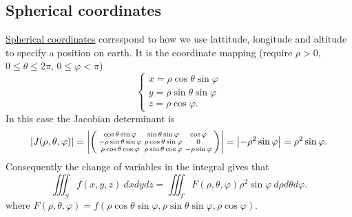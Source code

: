 \subsection*{Spherical coordinates}

\href{https://en.wikipedia.org/wiki/Spherical_coordinate_system}{Spherical coordinates} correspond to how we use lattitude, longitude and altitude to specify a position on earth.
It is the coordinate mapping (require \(\rho>0\), \(0\leq \theta \leq 2\pi\), \(0\leq \varphi <\pi\))
\[
    \begin{cases}
        x = \rho \cos \theta \sin \varphi \\
        y = \rho \sin \theta \sin \varphi \\
        z = \rho \cos \varphi.
    \end{cases}
\]
In this case the Jacobian determinant is
\[
    \left|J(\rho,\theta,\varphi)\right|
    =
    \left|\left(\begin{smallmatrix}
            \cos \theta \sin \varphi       & \sin \theta \sin \varphi      & \cos \varphi        \\
            -\rho \sin \theta \sin \varphi & \rho \cos \theta \sin \varphi & 0                   \\
            \rho \cos \theta \cos \varphi  & \rho \sin \theta \cos \varphi & - \rho \sin \varphi
        \end{smallmatrix}\right)\right|
    =
    \left|- \rho^2 \sin \varphi\right|
    = \rho^2 \sin \varphi.
\]
Consequently the change of variables in the integral gives that
\[
    \iiint_{S} f(x,y,z) \ dx dy dz =  \iiint_{T}  F(\rho,\theta,\varphi) \rho^2 \sin \varphi  \ d\rho d\theta d\varphi.
\]
where \(F(\rho,\theta,\varphi) = f(\rho \cos \theta \sin \varphi, \rho \sin \theta \sin \varphi,   \rho \cos \varphi  ) \).